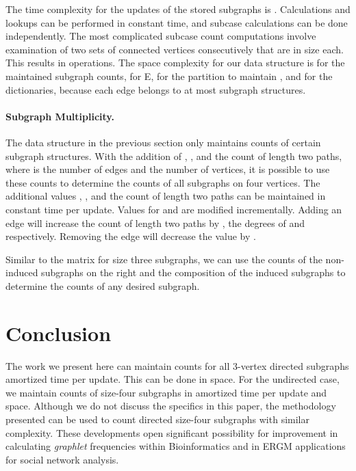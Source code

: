 \documentclass[11pt]{article}
\renewcommand{\subsection}[1]{\paragraph{\textbf{#1}.}}
\begin{document}
The time complexity for the updates of the stored subgraphs is .  Calculations and lookups can be performed in constant time, and subcase calculations can be done independently.  The most complicated subcase count computations involve examination of two sets of connected vertices consecutively that are  in size each.  This results in  operations.  The space complexity for our data structure is  for the maintained subgraph counts,  for E,  for the partition to maintain , and  for the dictionaries, because each edge belongs to at most  subgraph structures.

\subsection{Subgraph Multiplicity}
The data structure in the previous section only maintains counts of certain subgraph structures.  With the addition of , , and the count of length two paths, where  is the number of edges and  the number of vertices, it is possible to use these counts to determine the counts of all subgraphs on four vertices.  The additional values , , and the count of length two paths can be maintained in constant time per update.  Values for  and  are modified incrementally.  Adding an edge  will increase the count of length two paths by , the degrees of  and  respectively. Removing the edge will decrease the value by .

\setcounter{MaxMatrixCols}{11}
{\small

}

Similar to the matrix for size three subgraphs, we can use the counts of the non-induced subgraphs on the right and the composition of the induced subgraphs to determine the counts of any desired subgraph.

\section{Conclusion}

The work we present here can maintain counts for all 3-vertex directed subgraphs 
 amortized time per update.  This can be done in 
 space.  For the undirected case, we maintain counts of size-four subgraphs
in  amortized time per update and  space.  Although we do not discuss the specifics in this paper, the methodology presented 
can be used to count directed size-four subgraphs with similar complexity. 
These developments open significant possibility for improvement in calculating \emph{graphlet} 
frequencies within Bioinformatics and in ERGM applications for 
social network analysis. 
\end{document}
